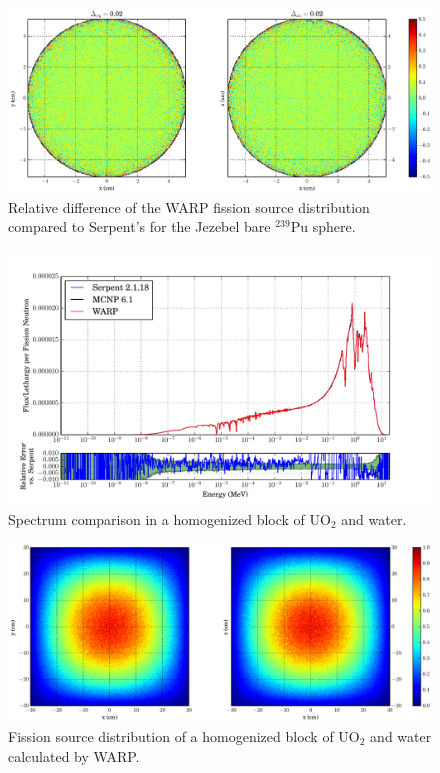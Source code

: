 \begin{figure}[h!]
\centering
\includegraphics[width=\textwidth,trim= 5cm 0cm 7cm 0cm]{graphics/finalresults/godiva_fiss_diff-6.eps}
\caption{Relative difference of the WARP fission source distribution compared to Serpent's for the Jezebel bare $^{239}$Pu sphere. \label{godiva_fiss_diff} }
\end{figure}

\begin{figure}[h!] 
\centering
\includegraphics[width=\textwidth,trim= 1cm 0cm 1cm 0cm]{graphics/finalresults/homfuel_spec-6.pdf}
\caption{Spectrum comparison in a homogenized block of UO$_2$ and water. \label{homfuel_spec} }
\end{figure}

\begin{figure}[h!]
\centering
\includegraphics[width=\textwidth,trim= 5cm 0cm 7cm 0cm]{graphics/finalresults/homfuel_fiss-6.eps}
\caption{Fission source distribution of a homogenized block of UO$_2$ and water calculated by WARP. \label{homfuel_fiss} }
\end{figure}

